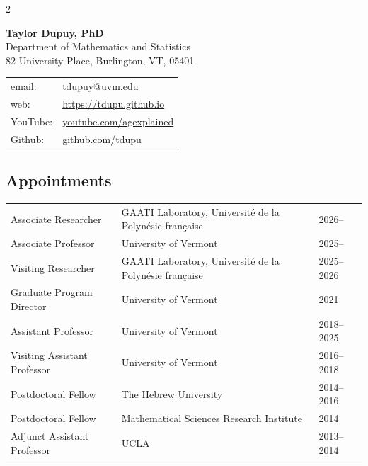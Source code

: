 \documentclass[a4paper,10pt]{article}
\begin{document}

\begin{multicols}{2}
\begin{flushleft}
    {\Large \bf Taylor Dupuy, PhD}\\
	Department of Mathematics and Statistics \\
	82 University Place, Burlington, VT, 05401  
	\newline \newline
	\begin{tabular}{ll}
		email: & tdupuy@uvm.edu\\
		web: & \url{https://tdupu.github.io}\\
		YouTube: & \url{youtube.com/agexplained} \\
		Github: & \url{github.com/tdupu} 
	\end{tabular}
\end{flushleft}
\end{multicols}

 
 
 \subsection*{Appointments}
 \vspace*{-10pt}
\begin{center}
\begin{tabular}{p{1.7in} p{3.5in}p{1in}}
Associate Researcher & GAATI Laboratory, Universit\'e de la Polyn\'esie fran\c{c}aise & 2026--\\
Associate Professor & University of Vermont & 2025--\\
Visiting Researcher & GAATI Laboratory, Universit\'e de la Polyn\'esie fran\c{c}aise & 2025--2026\\
Graduate Program Director & University of Vermont & 2021 \\
Assistant Professor & University of Vermont & 2018--2025 \\
Visiting Assistant Professor & University of Vermont & 2016--2018 \\
Postdoctoral Fellow & The Hebrew University& 2014--2016 \\
Postdoctoral Fellow & Mathematical Sciences Research Institute & 2014 \\
Adjunct Assistant Professor & UCLA & 2013--2014 \\
\end{tabular}
\end{center}
\end{document}
